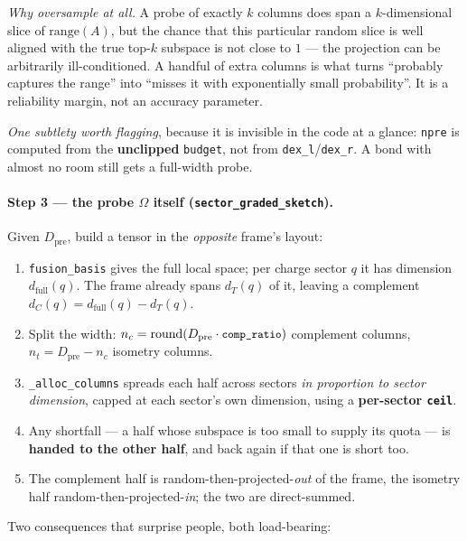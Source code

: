 \documentclass[11pt,a4paper]{article}
\newcommand{\Om}{\Omega}
\newcommand{\Dpre}{D_{\mathrm{pre}}}
\newcommand{\code}[1]{\texttt{\small #1}}
\begin{document}
\emph{Why oversample at all.} A probe of exactly $k$ columns does span a $k$-dimensional slice of
$\mathrm{range}(A)$, but the chance that this particular random slice is well aligned with the
true top-$k$ subspace is not close to $1$ --- the projection can be arbitrarily ill-conditioned.
A handful of extra columns is what turns ``probably captures the range'' into ``misses it with
exponentially small probability''. It is a reliability margin, not an accuracy parameter.

\emph{One subtlety worth flagging}, because it is invisible in the code at a glance: \code{npre}
is computed from the \textbf{unclipped} \code{budget}, not from \code{dex\_l}/\code{dex\_r}. A
bond with almost no room still gets a full-width probe.

\paragraph{Step 3 --- the probe $\Om$ itself (\code{sector\_graded\_sketch}).}
Given $\Dpre$, build a tensor in the \emph{opposite} frame's layout:
\begin{enumerate}[leftmargin=1.4em,itemsep=1pt]
\item \code{fusion\_basis} gives the full local space; per charge sector $q$ it has dimension
$d_{\text{full}}(q)$. The frame already spans $d_T(q)$ of it, leaving a complement
$d_C(q) = d_{\text{full}}(q) - d_T(q)$.
\item Split the width: $n_c = \mathrm{round}(\Dpre \cdot \code{comp\_ratio})$ complement columns,
$n_t = \Dpre - n_c$ isometry columns.
\item \code{\_alloc\_columns} spreads each half across sectors \emph{in proportion to sector
dimension}, capped at each sector's own dimension, using a \textbf{per-sector \code{ceil}}.
\item Any shortfall --- a half whose subspace is too small to supply its quota --- is
\textbf{handed to the other half}, and back again if that one is short too.
\item The complement half is random-then-projected-\emph{out} of the frame, the isometry half
random-then-projected-\emph{in}; the two are direct-summed.
\end{enumerate}

Two consequences that surprise people, both load-bearing:
\end{document}
